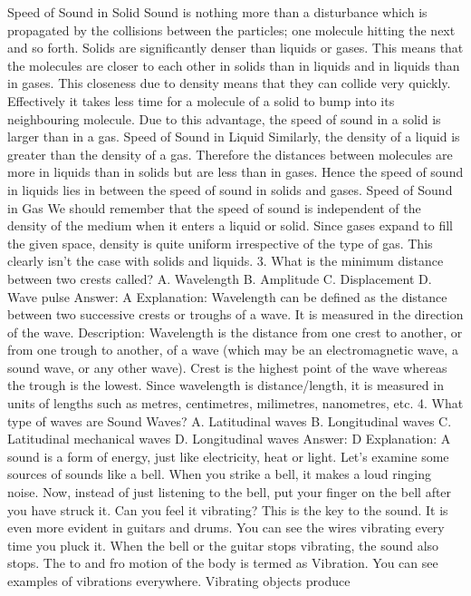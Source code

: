 Speed of Sound in Solid
Sound is nothing more than a disturbance which is propagated by the
collisions between the particles; one molecule hitting the next and so
forth. Solids are significantly denser than liquids or gases. This
means that the molecules are closer to each other in solids than in
liquids and in liquids than in gases. This closeness due to density
means that they can collide very quickly. Effectively it takes less
time for a molecule of a solid to bump into its neighbouring molecule.
Due to this advantage, the speed of sound in a solid is larger than in
a gas.
Speed of Sound in Liquid
Similarly, the density of a liquid is greater than the density of a gas.
Therefore the distances between molecules are more in liquids than
in solids but are less than in gases. Hence the speed of sound in
liquids lies in between the speed of sound in solids and gases.
Speed of Sound in Gas
We should remember that the speed of sound is independent of the
density of the medium when it enters a liquid or solid. Since gases
expand to fill the given space, density is quite uniform irrespective
of the type of gas. This clearly isn’t the case with solids and liquids.
3. What is the minimum distance between two crests called?
A. Wavelength
B. Amplitude
C. Displacement
D. Wave pulse
Answer: A
Explanation: Wavelength can be defined as the distance between
two successive crests or troughs of a wave. It is measured in the
direction of the wave.
Description: Wavelength is the distance from one crest to another,
or from one trough to another, of a wave (which may be an
electromagnetic wave, a sound wave, or any other wave). Crest is the
highest point of the wave whereas the trough is the lowest. Since
wavelength is distance/length, it is measured in units of lengths such
as metres, centimetres, milimetres, nanometres, etc.
4. What type of waves are Sound Waves?
A. Latitudinal waves
B. Longitudinal waves
C. Latitudinal mechanical waves
D. Longitudinal waves
Answer: D
Explanation: A sound is a form of energy, just like electricity, heat
or light. Let’s examine some sources of sounds like a bell. When you
strike a bell, it makes a loud ringing noise. Now, instead of just
listening to the bell, put your finger on the bell after you have
struck it. Can you feel it vibrating? This is the key to the sound. It
is even more evident in guitars and drums. You can see the wires
vibrating every time you pluck it. When the bell or the guitar stops
vibrating, the sound also stops.
The to and fro motion of the body is termed as Vibration. You can
see examples of vibrations everywhere. Vibrating objects produce
